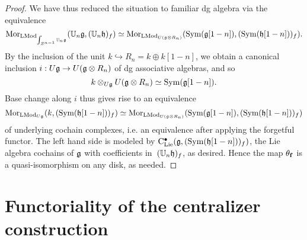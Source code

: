 \documentclass[11pt]{amsart}
\numberwithin{equation}{section}
\begin{document}
\begin{proof}
We have thus reduced the situation to familiar dg algebra via the equivalence
\[
{\rm Mor}_{{\rm LMod}_{\int_{S^{n-1}} \mathbb U_n\mathfrak g}}(\mathbb U_n \mathfrak g, (\mathbb U_n \mathfrak h)_f) 
\simeq 
{\rm Mor}_{{\rm LMod}_{U(\mathfrak g \otimes R_n)}} ({\rm Sym}(\mathfrak g[1-n]), ({\rm Sym}(\mathfrak h[1-n]))_f).
\]
By the inclusion of the unit $k \hookrightarrow R_n = k \oplus k[1-n]$,
we obtain a canonical inclusion $i: U\mathfrak g \to U(\mathfrak g \otimes R_n)$ of dg associative algebras,
and so
\[
k \otimes_{U\mathfrak g} U(\mathfrak g \otimes R_n) \simeq {\rm Sym}(\mathfrak g[1-n]).
\]
Base change along $i$ thus gives rise to an equivalence 
\[
{\rm Mor}_{{\rm LMod}_{U\mathfrak g}} (k, ({\rm Sym}(\mathfrak h[1-n]))_f) \simeq {\rm Mor}_{{\rm LMod}_{U(\mathfrak g \otimes R_n)}} ({\rm Sym}(\mathfrak g[1-n]), ({\rm Sym}(\mathfrak h[1-n]))_f)
\]
of underlying cochain complexes, i.e. an equivalence after applying the forgetful functor. 
The left hand side is modeled by ${\rm C}_{\rm Lie}^\bullet(\mathfrak g,({\rm Sym}(\mathfrak h[1-n]))_f)$, 
the Lie algebra cochains of $\mathfrak g$ with coefficients in~$(\mathbb U_n \mathfrak h)_f$, as desired.
Hence the map $\theta_{\bf f}$ is a quasi-isomorphism on any disk, as needed.
\end{proof}

\section{Functoriality of the centralizer construction}
\label{S:centerinFacAlg}
\end{document}
